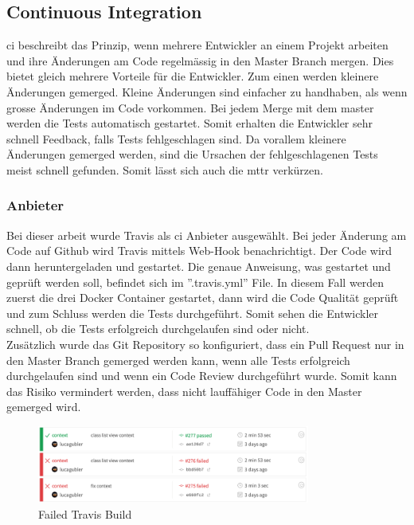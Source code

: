 \subsection{Continuous Integration}
\gls{ci} beschreibt das Prinzip, wenn mehrere Entwickler an einem Projekt arbeiten und ihre Änderungen am Code regelmässig in den Master Branch mergen. Dies bietet gleich mehrere Vorteile für die Entwickler. Zum einen werden kleinere Änderungen gemerged. Kleine Änderungen sind einfacher zu handhaben, als wenn grosse Änderungen im Code vorkommen. Bei jedem Merge mit dem master werden die Tests automatisch gestartet. Somit erhalten die Entwickler sehr schnell Feedback, falls Tests fehlgeschlagen sind. Da vorallem kleinere Änderungen gemerged werden, sind die Ursachen der fehlgeschlagenen Tests meist schnell gefunden. Somit lässt sich auch die \gls{mttr} verkürzen.

\subsubsection*{Anbieter}
Bei dieser arbeit wurde Travis als \gls{ci} Anbieter ausgewählt. Bei jeder Änderung am Code auf Github wird Travis mittels Web-Hook benachrichtigt. Der Code wird dann heruntergeladen und gestartet. Die genaue Anweisung, was gestartet und geprüft werden soll, befindet sich im ''.travis.yml'' File. In diesem Fall werden zuerst die drei Docker Container gestartet,  dann wird die Code Qualität geprüft und zum Schluss werden die Tests durchgeführt. Somit sehen die Entwickler schnell, ob die Tests erfolgreich durchgelaufen sind oder nicht. \\

Zusätzlich wurde das Git Repository so konfiguriert, dass ein Pull Request nur in den Master Branch gemerged werden kann, wenn alle Tests erfolgreich durchgelaufen sind und wenn ein Code Review durchgeführt wurde. Somit kann das Risiko vermindert werden, dass nicht lauffähiger Code in den Master gemerged wird. \\

	\begin{figure}[H]
	\begin{center}
			\includegraphics[width=0.8\textwidth, keepaspectratio]{images/travis_build.png}
		\caption{Failed Travis Build}
			\label{fig:trvis_build}
	\end{center}

	\end{figure}

